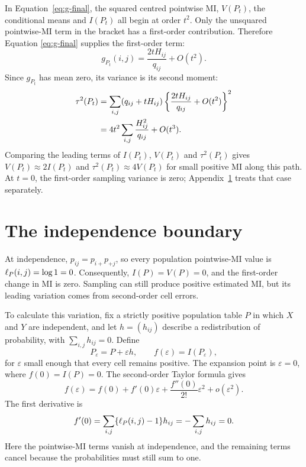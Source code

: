 In Equation~\eqref{eq:g-final}, the squared centred pointwise MI,
\(V(P_t)\), the conditional means and \(I(P_t)\) all begin at order
\(t^2\). Only the unsquared pointwise-MI term in the bracket has a
first-order contribution. Therefore Equation
\eqref{eq:g-final} supplies the first-order term:
\begin{equation}
 g_{P_t}(i,j)=\frac{2tH_{ij}}{q_{ij}}+O(t^2).
\end{equation}
Since \(g_{P_t}\) has mean zero, its variance is its second moment:
\begin{align}
 \tau^2(P_t)
 &=\sum_{i,j}(q_{ij}+tH_{ij})
   \left\{\frac{2tH_{ij}}{q_{ij}}+O(t^2)\right\}^2\notag\\*
 &=4t^2\sum_{i,j}\frac{H_{ij}^2}{q_{ij}}+O(t^3).
\end{align}
Comparing the leading terms of \(I(P_t)\), \(V(P_t)\) and \(\tau^2(P_t)\)
gives \(V(P_t)\approx2I(P_t)\) and
\(\tau^2(P_t)\approx4V(P_t)\) for small positive MI along this path.
At \(t=0\), the first-order sampling variance is zero;
Appendix~\ref{sec:independence-boundary} treats that case separately.

\section{The independence boundary}
\label{sec:independence-boundary}

At independence, \(p_{ij}=p_{i+}p_{+j}\), so every population
pointwise-MI value is \(\ell_P(i,j)=\log 1=0\). Consequently,
\(I(P)=V(P)=0\), and the first-order change in MI is zero. Sampling can
still produce positive estimated MI, but its leading variation comes from
second-order cell errors.

To calculate this variation, fix a strictly positive population table
\(P\) in which \(X\) and \(Y\) are independent, and let \(h=(h_{ij})\)
describe a redistribution of probability,
with \(\sum_{i,j}h_{ij}=0\). Define
\begin{equation}
 P_\varepsilon=P+\varepsilon h,
 \qquad f(\varepsilon)=I(P_\varepsilon),
\end{equation}
for \(\varepsilon\) small enough that every cell remains positive.
The expansion point is \(\varepsilon=0\), where \(f(0)=I(P)=0\).
The second-order Taylor formula gives
\begin{equation}
 f(\varepsilon)
 =f(0)+f'(0)\varepsilon+\frac{f''(0)}{2!}\varepsilon^2
  +o(\varepsilon^2).
\end{equation}
The first derivative is
\begin{equation}
 f'(0)=\sum_{i,j}\{\ell_P(i,j)-1\}h_{ij}
       =-\sum_{i,j}h_{ij}=0.
\end{equation}
Here the pointwise-MI terms vanish at independence, and the remaining
terms cancel because the probabilities must still sum to one.

